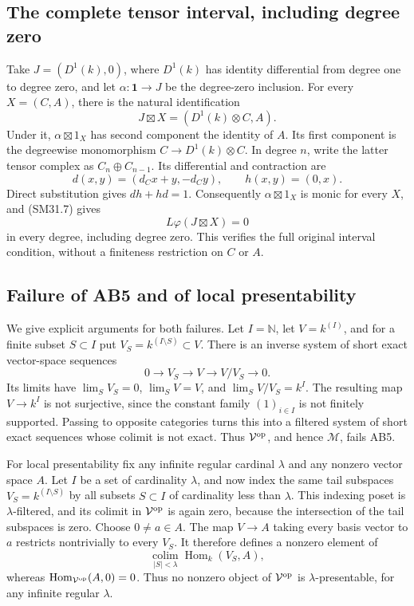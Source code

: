\subsection{The complete tensor interval, including degree zero}
Take \(J=(D^1(k),0)\), where \(D^1(k)\) has identity
differential from degree one to degree zero, and let
\(\alpha:\mathbf1\to J\) be the degree-zero inclusion.
For every \(X=(C,A)\), there is the natural identification
\[
                 J\boxtimes X=(D^1(k)\otimes C,A).          \tag{SM31.8}
\]
Under it, \(\alpha\boxtimes1_X\) has second component the
identity of \(A\).  Its first component is the degreewise
monomorphism \(C\to D^1(k)\otimes C\).
In degree \(n\), write the latter tensor complex as
\(C_n\oplus C_{n-1}\).  Its differential and contraction are
\[
 d(x,y)=(d_Cx+y,-d_Cy),\qquad h(x,y)=(0,x).
\]
Direct substitution gives \(dh+hd=1\).
Consequently \(\alpha\boxtimes1_X\) is monic for every
\(X\), and (SM31.7) gives
\[
                    L\varphi(J\boxtimes X)=0
\]
in every degree, including degree zero.  This verifies the
full original interval condition, without a finiteness
restriction on \(C\) or \(A\).

\subsection{Failure of AB5 and of local presentability}
We give explicit arguments for both failures.
Let \(I=\mathbb N\), let \(V=k^{(I)}\), and for a finite
subset \(S\subset I\) put
\(V_S=k^{(I\setminus S)}\subset V\).
There is an inverse system of short exact vector-space
sequences
\[
          0\longrightarrow V_S\longrightarrow V
                  \longrightarrow V/V_S\longrightarrow0.
\]
Its limits have
\(\lim_S V_S=0\), \(\lim_S V=V\), and
\(\lim_S V/V_S=k^I\).
The resulting map \(V\to k^I\) is not surjective, since
the constant family \((1)_{i\in I}\) is not finitely supported.
Passing to opposite categories turns this into a filtered
system of short exact sequences whose colimit is not exact.
Thus \(\mathcal V^{\rm op}\), and hence \(\mathcal M\),
fails AB5.

For local presentability fix any infinite regular cardinal
\(\lambda\) and any nonzero vector space \(A\).
Let \(I\) be a set of cardinality \(\lambda\), and now
index the same tail subspaces \(V_S=k^{(I\setminus S)}\)
by all subsets \(S\subset I\) of cardinality less than
\(\lambda\).  This indexing poset is \(\lambda\)-filtered,
and its colimit in \(\mathcal V^{\rm op}\) is again zero,
because the intersection of the tail subspaces is zero.
Choose \(0\ne a\in A\).  The map \(V\to A\) taking every
basis vector to \(a\) restricts nontrivially to every \(V_S\).
It therefore defines a nonzero element of
\[
 \operatorname*{colim}_{|S|<\lambda}
          \operatorname{Hom}_k(V_S,A),
\]
whereas \(\operatorname{Hom}_{\mathcal V^{\rm op}}(A,0)=0\).
Thus no nonzero object of \(\mathcal V^{\rm op}\) is
\(\lambda\)-presentable, for any infinite regular \(\lambda\).

